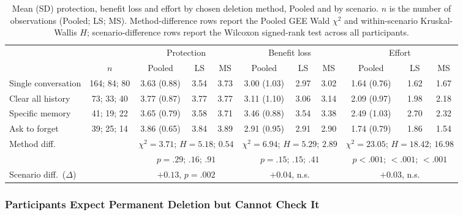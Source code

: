 \documentclass[conference,compsoc]{IEEEtran}
\begin{document}
\begin{table}[t]
\centering
\caption{Mean (SD) protection, benefit loss and effort by chosen deletion method, Pooled and by scenario. $n$ is the number of observations (Pooled; LS; MS). Method-difference rows report the Pooled GEE Wald $\chi^2$ and within-scenario Kruskal-Wallis $H$; scenario-difference rows report the Wilcoxon signed-rank test across all participants.}
\label{tab:method-scales}
\small
\setlength{\tabcolsep}{4pt}
\begin{tabular}{lcccccccccc}
\toprule
 & & \multicolumn{3}{c}{Protection} & \multicolumn{3}{c}{Benefit loss} & \multicolumn{3}{c}{Effort} \\
\cmidrule(lr){3-5}\cmidrule(lr){6-8}\cmidrule(lr){9-11}
 & $n$ & Pooled & LS & MS & Pooled & LS & MS & Pooled & LS & MS \\
\midrule
Single conversation & 164; 84; 80 & 3.63 (0.88) & 3.54 & 3.73 & 3.00 (1.03) & 2.97 & 3.02 & 1.64 (0.76) & 1.62 & 1.67 \\
Clear all history & 73; 33; 40 & 3.77 (0.87) & 3.77 & 3.77 & 3.11 (1.10) & 3.06 & 3.14 & 2.09 (0.97) & 1.98 & 2.18 \\
Specific memory & 41; 19; 22 & 3.65 (0.79) & 3.58 & 3.71 & 3.46 (0.88) & 3.54 & 3.38 & 2.49 (1.03) & 2.70 & 2.32 \\
Ask to forget & 39; 25; 14 & 3.86 (0.65) & 3.84 & 3.89 & 2.91 (0.95) & 2.91 & 2.90 & 1.74 (0.79) & 1.86 & 1.54 \\
\midrule
\multicolumn{2}{l}{Method diff.}
  & \multicolumn{3}{c}{$\chi^2\!=\!3.71$; $H\!=\!5.18$; $0.54$}
  & \multicolumn{3}{c}{$\chi^2\!=\!6.94$; $H\!=\!5.29$; $2.89$}
  & \multicolumn{3}{c}{$\chi^2\!=\!23.05$; $H\!=\!18.42$; $16.98$} \\
\multicolumn{2}{l}{}
  & \multicolumn{3}{c}{$p\!=\!.29$; $.16$; $.91$}
  & \multicolumn{3}{c}{$p\!=\!.15$; $.15$; $.41$}
  & \multicolumn{3}{c}{$p\!<\!.001$; $<\!.001$; $<\!.001$} \\
\multicolumn{2}{l}{Scenario diff.\ ($\Delta$)}
  & \multicolumn{3}{c}{$+0.13$, $p\!=\!.002$}
  & \multicolumn{3}{c}{$+0.04$, n.s.}
  & \multicolumn{3}{c}{$+0.03$, n.s.} \\
\bottomrule
\end{tabular}
\end{table}

\subsubsection{Participants Expect Permanent Deletion but Cannot Check It}
\label{sec:expectations}
\end{document}
